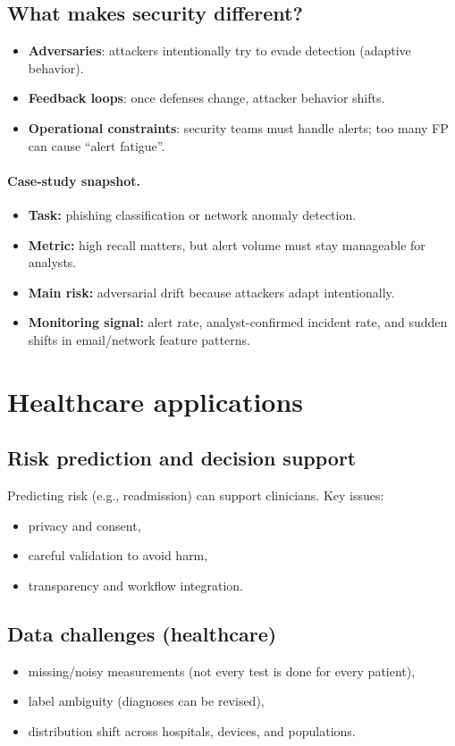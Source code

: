 \documentclass[11pt]{article}
\begin{document}
\subsection{What makes security different?}
\begin{itemize}[leftmargin=*]
  \item \textbf{Adversaries}: attackers intentionally try to evade detection (adaptive behavior).
  \item \textbf{Feedback loops}: once defenses change, attacker behavior shifts.
  \item \textbf{Operational constraints}: security teams must handle alerts; too many FP can cause ``alert fatigue''.
\end{itemize}

\paragraph{Case-study snapshot.}
\begin{itemize}[leftmargin=*]
  \item \textbf{Task:} phishing classification or network anomaly detection.
  \item \textbf{Metric:} high recall matters, but alert volume must stay manageable for analysts.
  \item \textbf{Main risk:} adversarial drift because attackers adapt intentionally.
  \item \textbf{Monitoring signal:} alert rate, analyst-confirmed incident rate, and sudden shifts in email/network feature patterns.
\end{itemize}

\section{Healthcare applications}
\subsection{Risk prediction and decision support}
Predicting risk (e.g., readmission) can support clinicians. Key issues:
\begin{itemize}[leftmargin=*]
  \item privacy and consent,
  \item careful validation to avoid harm,
  \item transparency and workflow integration.
\end{itemize}

\subsection{Data challenges (healthcare)}
\begin{itemize}[leftmargin=*]
  \item missing/noisy measurements (not every test is done for every patient),
  \item label ambiguity (diagnoses can be revised),
  \item distribution shift across hospitals, devices, and populations.
\end{itemize}
\end{document}
